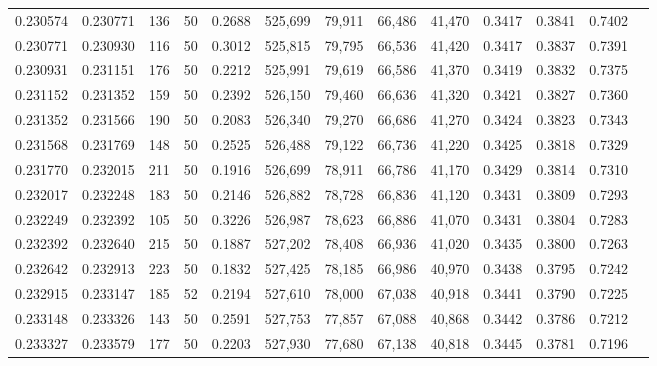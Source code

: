 \begin{tabular}{rrrrrrrrrrrrr}
0.230574 & 0.230771 &   136 &  50 &                                     0.2688 & 525,699 &  79,911 &  66,486 &  41,470 & 0.3417 & 0.3841 & 0.7402 \\
0.230771 & 0.230930 &   116 &  50 &                                     0.3012 & 525,815 &  79,795 &  66,536 &  41,420 & 0.3417 & 0.3837 & 0.7391 \\
0.230931 & 0.231151 &   176 &  50 &                                     0.2212 & 525,991 &  79,619 &  66,586 &  41,370 & 0.3419 & 0.3832 & 0.7375 \\
0.231152 & 0.231352 &   159 &  50 &                                     0.2392 & 526,150 &  79,460 &  66,636 &  41,320 & 0.3421 & 0.3827 & 0.7360 \\
0.231352 & 0.231566 &   190 &  50 &                                     0.2083 & 526,340 &  79,270 &  66,686 &  41,270 & 0.3424 & 0.3823 & 0.7343 \\
0.231568 & 0.231769 &   148 &  50 &                                     0.2525 & 526,488 &  79,122 &  66,736 &  41,220 & 0.3425 & 0.3818 & 0.7329 \\
0.231770 & 0.232015 &   211 &  50 &                                     0.1916 & 526,699 &  78,911 &  66,786 &  41,170 & 0.3429 & 0.3814 & 0.7310 \\
0.232017 & 0.232248 &   183 &  50 &                                     0.2146 & 526,882 &  78,728 &  66,836 &  41,120 & 0.3431 & 0.3809 & 0.7293 \\
0.232249 & 0.232392 &   105 &  50 &                                     0.3226 & 526,987 &  78,623 &  66,886 &  41,070 & 0.3431 & 0.3804 & 0.7283 \\
0.232392 & 0.232640 &   215 &  50 &                                     0.1887 & 527,202 &  78,408 &  66,936 &  41,020 & 0.3435 & 0.3800 & 0.7263 \\
0.232642 & 0.232913 &   223 &  50 &                                     0.1832 & 527,425 &  78,185 &  66,986 &  40,970 & 0.3438 & 0.3795 & 0.7242 \\
0.232915 & 0.233147 &   185 &  52 &                                     0.2194 & 527,610 &  78,000 &  67,038 &  40,918 & 0.3441 & 0.3790 & 0.7225 \\
0.233148 & 0.233326 &   143 &  50 &                                     0.2591 & 527,753 &  77,857 &  67,088 &  40,868 & 0.3442 & 0.3786 & 0.7212 \\
0.233327 & 0.233579 &   177 &  50 &                                     0.2203 & 527,930 &  77,680 &  67,138 &  40,818 & 0.3445 & 0.3781 & 0.7196 \\

\end{tabular}
